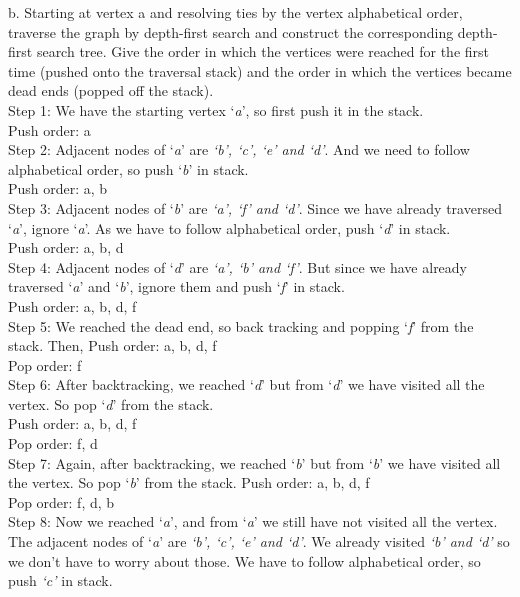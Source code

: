\documentclass{article}
\begin{document}
b. Starting at vertex a and resolving ties by the vertex alphabetical order, traverse the graph by depth-first search and construct the corresponding depth-first search tree. Give the order in which the vertices were reached for the first time (pushed onto the traversal stack) and the order in which the vertices became dead ends (popped off the stack). \\
Step 1: We have the starting vertex `\textit{a}', so first push it in the stack. \\
\indent \indent \indent Push order: a \\
Step 2: Adjacent nodes of `\textit{a}' are \textit{`b', `c', `e' and `d'}. And we need to follow alphabetical order, so push `\textit{b}' in stack. \\
\indent \indent \indent Push order: a, b \\
Step 3: Adjacent nodes of `\textit{b}' are \textit{`a', `f' and `d'}. Since we have already traversed `\textit{a}', ignore `\textit{a}'. As we have to follow alphabetical order, push `\textit{d}' in stack. \\
\indent \indent \indent Push order: a, b, d \\
Step 4: Adjacent nodes of `\textit{d}' are \textit{`a', `b' and `f'}. But since we have already traversed `\textit{a}' and `\textit{b}', ignore them and push `\textit{f}' in stack. \\
\indent \indent \indent Push order: a, b, d, f \\
Step 5: We reached the dead end, so back tracking and popping `\textit{f}' from the stack. Then,
\indent \indent \indent Push order: a, b, d, f \\
\indent \indent \indent Pop order: f \\
Step 6: After backtracking, we reached `\textit{d}' but from `\textit{d}' we have visited all the vertex. So pop `\textit{d}' from the stack. \\
\indent \indent \indent Push order: a, b, d, f \\
\indent \indent \indent Pop order: f, d \\
Step 7: Again, after backtracking, we reached `\textit{b}' but from `\textit{b}' we have visited all the vertex. So pop `\textit{b}' from the stack. 
\indent \indent \indent Push order: a, b, d, f \\
\indent \indent \indent Pop order: f, d, b \\
Step 8: Now we reached `\textit{a}', and from `\textit{a}' we still have not visited all the vertex. The adjacent nodes of `\textit{a}' are \textit{`b', `c', `e' and `d'}. We already visited \textit{`b' and `d'} so we don't have to worry about those. We have to follow alphabetical order, so push \textit{`c'} in stack. \\
\end{document}
